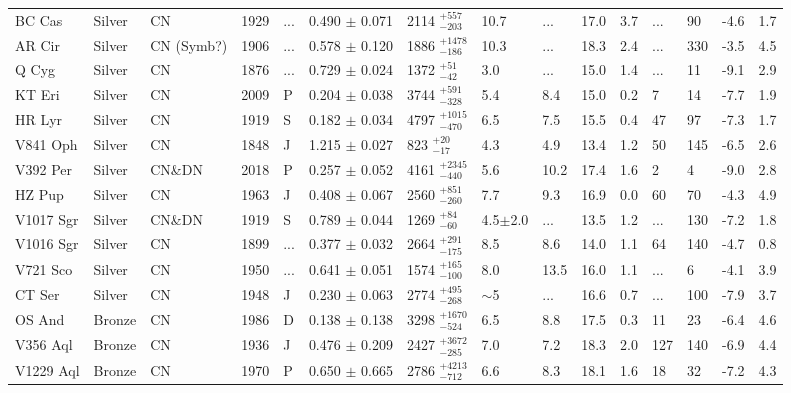 \documentclass[a4paper,fleqn,usenatbib]{mnras}
\begin{document}
\begin{table*}
\begin{tabular}{lllllllllllllll}
BC Cas	&	Silver	&	CN	&	1929	&	...	&	0.490	$\pm$	0.071	&	2114	$_{-	203	}^{+	557	}$ &	10.7	&	...	&	17.0	&	3.7	&	...	&	90	&	-4.6	&	1.7	\\
AR Cir	&	Silver	&	CN (Symb?)	&	1906	&	...	&	0.578	$\pm$	0.120	&	1886	$_{-	186	}^{+	1478	}$ &	10.3	&	...	&	18.3	&	2.4	&	...	&	330	&	-3.5	&	4.5	\\
Q Cyg	&	Silver	&	CN	&	1876	&	...	&	0.729	$\pm$	0.024	&	1372	$_{-	42	}^{+	51	}$ &	3.0	&	...	&	15.0	&	1.4	&	...	&	11	&	-9.1	&	2.9	\\
KT Eri	&	Silver	&	CN	&	2009	&	P	&	0.204	$\pm$	0.038	&	3744	$_{-	328	}^{+	591	}$ &	5.4	&	8.4	&	15.0	&	0.2	&	7	&	14	&	-7.7	&	1.9	\\
HR Lyr	&	Silver	&	CN	&	1919	&	S	&	0.182	$\pm$	0.034	&	4797	$_{-	470	}^{+	1015	}$ &	6.5	&	7.5	&	15.5	&	0.4	&	47	&	97	&	-7.3	&	1.7	\\
V841 Oph	&	Silver	&	CN	&	1848	&	J	&	1.215	$\pm$	0.027	&	823	$_{-	17	}^{+	20	}$ &	4.3	&	4.9	&	13.4	&	1.2	&	50	&	145	&	-6.5	&	2.6	\\
V392 Per	&	Silver	&	CN\&DN	&	2018	&	P	&	0.257	$\pm$	0.052	&	4161	$_{-	440	}^{+	2345	}$ &	5.6	&	10.2	&	17.4	&	1.6	&	2	&	4	&	-9.0	&	2.8	\\
HZ Pup	&	Silver	&	CN	&	1963	&	J	&	0.408	$\pm$	0.067	&	2560	$_{-	260	}^{+	851	}$ &	7.7	&	9.3	&	16.9	&	0.0	&	60	&	70	&	-4.3	&	4.9	\\
V1017 Sgr	&	Silver	&	CN\&DN	&	1919	&	S	&	0.789	$\pm$	0.044	&	1269	$_{-	60	}^{+	84	}$ &	4.5$\pm$2.0	&	...	&	13.5	&	1.2	&	...	&	130	&	-7.2	&	1.8	\\
V1016 Sgr	&	Silver	&	CN	&	1899	&	...	&	0.377	$\pm$	0.032	&	2664	$_{-	175	}^{+	291	}$ &	8.5	&	8.6	&	14.0	&	1.1	&	64	&	140	&	-4.7	&	0.8	\\
V721 Sco	&	Silver	&	CN	&	1950	&	...	&	0.641	$\pm$	0.051	&	1574	$_{-	100	}^{+	165	}$ &	8.0	&	13.5	&	16.0	&	1.1	&	...	&	6	&	-4.1	&	3.9	\\
CT Ser	&	Silver	&	CN	&	1948	&	J	&	0.230	$\pm$	0.063	&	2774	$_{-	268	}^{+	495	}$ &	$\sim$5	&	...	&	16.6	&	0.7	&	...	&	100	&	-7.9	&	3.7	\\
OS And	&	Bronze	&	CN	&	1986	&	D	&	0.138	$\pm$	0.138	&	3298	$_{-	524	}^{+	1670	}$ &	6.5	&	8.8	&	17.5	&	0.3	&	11	&	23	&	-6.4	&	4.6	\\
V356 Aql	&	Bronze	&	CN	&	1936	&	J	&	0.476	$\pm$	0.209	&	2427	$_{-	285	}^{+	3672	}$ &	7.0	&	7.2	&	18.3	&	2.0	&	127	&	140	&	-6.9	&	4.4	\\
V1229 Aql	&	Bronze	&	CN	&	1970	&	P	&	0.650	$\pm$	0.665	&	2786	$_{-	712	}^{+	4213	}$ &	6.6	&	8.3	&	18.1	&	1.6	&	18	&	32	&	-7.2	&	4.3	\\

\end{tabular}
\end{table*}
\end{document}
